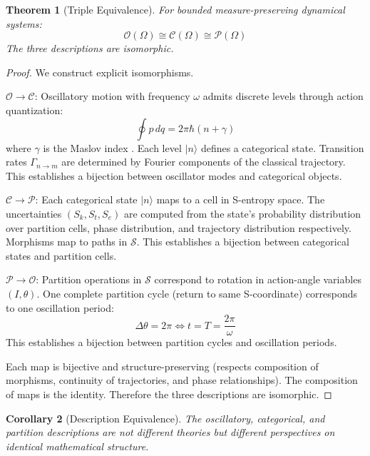 \documentclass[10pt,twocolumn]{article}
\theoremstyle{plain}
\newtheorem{theorem}{Theorem}[section]
\newtheorem{corollary}[theorem]{Corollary}
\theoremstyle{definition}
\theoremstyle{remark}
\newcommand{\Sspace}{\mathcal{S}}
\newcommand{\Sk}{S_k}
\newcommand{\St}{S_t}
\newcommand{\Se}{S_e}
\newcommand{\Pcat}{\mathcal{P}}
\newcommand{\Ocat}{\mathcal{O}}
\newcommand{\Ccat}{\mathcal{C}}
\begin{document}
\begin{theorem}[Triple Equivalence]
\label{thm:triple}
For bounded measure-preserving dynamical systems:
\begin{equation}
\Ocat(\Omega) \cong \Ccat(\Omega) \cong \Pcat(\Omega)
\label{eq:triple_equiv}
\end{equation}
The three descriptions are isomorphic.
\end{theorem}

\begin{proof}
We construct explicit isomorphisms.

\textbf{$\Ocat \to \Ccat$}: Oscillatory motion with frequency $\omega$ admits discrete levels through action quantization:
\begin{equation}
\oint p \, dq = 2\pi\hbar(n + \gamma)
\end{equation}
where $\gamma$ is the Maslov index \citep{maslov1981}. Each level $|n\rangle$ defines a categorical state. Transition rates $\Gamma_{n \to m}$ are determined by Fourier components of the classical trajectory. This establishes a bijection between oscillator modes and categorical objects.

\textbf{$\Ccat \to \Pcat$}: Each categorical state $|n\rangle$ maps to a cell in S-entropy space. The uncertainties $(\Sk, \St, \Se)$ are computed from the state's probability distribution over partition cells, phase distribution, and trajectory distribution respectively. Morphisms map to paths in $\Sspace$. This establishes a bijection between categorical states and partition cells.

\textbf{$\Pcat \to \Ocat$}: Partition operations in $\Sspace$ correspond to rotation in action-angle variables $(I, \theta)$. One complete partition cycle (return to same S-coordinate) corresponds to one oscillation period:
\begin{equation}
\Delta\theta = 2\pi \iff t = T = \frac{2\pi}{\omega}
\end{equation}
This establishes a bijection between partition cycles and oscillation periods.

Each map is bijective and structure-preserving (respects composition of morphisms, continuity of trajectories, and phase relationships). The composition of maps is the identity. Therefore the three descriptions are isomorphic.
\end{proof}

\begin{corollary}[Description Equivalence]
\label{cor:description}
The oscillatory, categorical, and partition descriptions are not different theories but different perspectives on identical mathematical structure.
\end{corollary}
\end{document}
